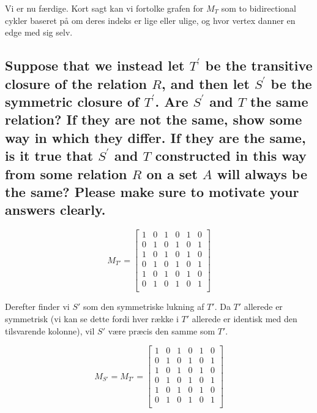 \documentclass[a4paper,12pt]{article}
\begin{document}
Vi er nu færdige. Kort sagt kan vi fortolke grafen for $M_T$ som to bidirectional cykler baseret på om deres indeks er lige eller ulige, og hvor vertex danner en edge med sig selv.

\subsection[]{Suppose that we instead let $T^\prime$ be the transitive closure of the relation $R$, and then let
$S^\prime$ be the symmetric closure of $T^\prime$. Are $S^\prime$ and $T$ the same relation? If they are not the
same, show some way in which they differ. If they are the same, is it true that $S^\prime$ and $T$
constructed in this way from some relation $R$ on a set $A$ will always be the same? Please
make sure to motivate your answers clearly.
}

\[
M_{T'} =
\begin{bmatrix}
    1 & 0 & 1 & 0 & 1 & 0 \\
    0 & 1 & 0 & 1 & 0 & 1 \\
    1 & 0 & 1 & 0 & 1 & 0 \\
    0 & 1 & 0 & 1 & 0 & 1 \\
    1 & 0 & 1 & 0 & 1 & 0 \\
    0 & 1 & 0 & 1 & 0 & 1 \\
\end{bmatrix}
\]

Derefter finder vi $S'$ som den symmetriske lukning af $T'$. Da $T'$ allerede er symmetrisk (vi kan se dette fordi hver række i $T'$ allerede er identisk med den tilsvarende kolonne), vil $S'$ være præcis den samme som $T'$.

\[M_{S'} = M_{T'} =
\begin{bmatrix}
    1 & 0 & 1 & 0 & 1 & 0 \\
    0 & 1 & 0 & 1 & 0 & 1 \\
    1 & 0 & 1 & 0 & 1 & 0 \\
    0 & 1 & 0 & 1 & 0 & 1 \\
    1 & 0 & 1 & 0 & 1 & 0 \\
    0 & 1 & 0 & 1 & 0 & 1 \\
\end{bmatrix}
\]
\end{document}
